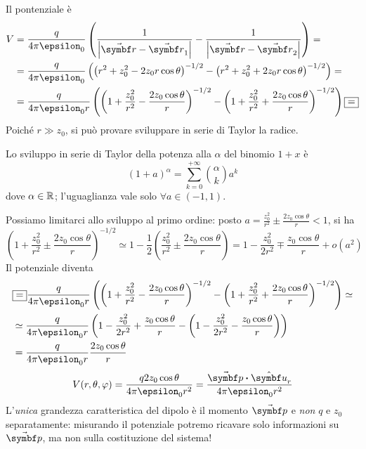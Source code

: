 Il pontenziale è
\begin{align*}
	V&=\frac{q}{4\pi\epsilon_0}\left(\frac{1}{\abs{\vba{r}-\vba{r}_1}}-\frac{1}{\abs{\vba{r}-\vba{r}_2}}\right)=\\
	&=\frac{q}{4\pi\epsilon_0}\left(\left(r^2+z_0^2-2z_0r\cos\theta\right)^{-1/2}-\left(r^2+z_0^2+2z_0r\cos\theta\right)^{-1/2}\right)=\\
	&=\frac{q}{4\pi\epsilon_0r}\left(\left(1+\frac{z_0^2}{r^2}-\frac{2z_0\cos\theta}{r}\right)^{-1/2}-\left(1+\frac{z_0^2}{r^2}+\frac{2z_0\cos\theta}{r}\right)^{-1/2}\right)\squarequal
\end{align*}
Poiché $r\gg z_0$, si può provare sviluppare in serie di Taylor la radice.
\begin{remember}
	Lo sviluppo in serie di Taylor della potenza alla $\alpha$ del binomio $1+x$ è
	\begin{equation}
		 \left(1+a\right)^\alpha=\sum_{k=0}^{+\infty}\binom{\alpha}{k}a^k
	\end{equation}
dove $\alpha\in\mathbb{R}$; l'uguaglianza vale solo $\forall a\in\left(-1,1\right)$.
\end{remember}
Possiamo limitarci allo sviluppo al primo ordine: posto $a=\frac{z_0^2}{r^2}\pm\frac{2z_0\cos\theta}{r}<1$, si ha
 \begin{equation*}
 	\left(1+\frac{z_0^2}{r^2}\pm\frac{2z_0\cos\theta}{r}\right)^{-1/2}\simeq1-\frac{1}{2}\left(\frac{z_0^2}{r^2}\pm\frac{2z_0\cos\theta}{r}\right)=1-\frac{z_0^2}{2r^2}\mp\frac{z_0\cos\theta}{r}+o(a^2)
 \end{equation*}
Il potenziale diventa
\begin{align*}
	&\squarequal\frac{q}{4\pi\epsilon_0r}\left(\left(1+\frac{z_0^2}{r^2}-\frac{2z_0\cos\theta}{r}\right)^{-1/2}-\left(1+\frac{z_0^2}{r^2}+\frac{2z_0\cos\theta}{r}\right)^{-1/2}\right)\simeq\\
	&\simeq\frac{q}{4\pi\epsilon_0r}\left(1-\frac{z_0^2}{2r^2}+\frac{z_0\cos\theta}{r}-\left(1-\frac{z_0^2}{2r^2}-\frac{z_0\cos\theta}{r}\right)\right)\\
	&=\frac{q}{4\pi\epsilon_0r}\frac{2z_0\cos\theta}{r}
\end{align*}
\begin{equation}
	V(r,\theta,\phi)=\frac{q2z_0\cos\theta}{4\pi\epsilon_0r^2}=\frac{\vba{p}\vdot\vbh{u}_r}{4\pi\epsilon_0r^2}
\end{equation}
L'\textit{unica} grandezza caratteristica del dipolo è il momento $\vba{p}$ e \textit{non} $q$ e $z_0$ separatamente: misurando il potenziale potremo ricavare solo informazioni su $\vba{p}$, ma non sulla costituzione del sistema!
